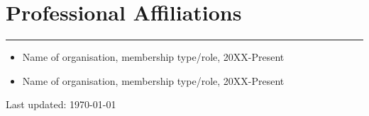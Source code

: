 \documentclass{article}
\begin{document}
\section*{Professional Affiliations}
\hrule
\vspace{1em}
\begin{itemize}[leftmargin=*]
    \item[]Name of organisation, membership type/role, 20XX-Present
    \item[]Name of organisation, membership type/role, 20XX-Present
\end{itemize}

\begin{center}
  \begin{footnotesize}
    Last updated: \today
  \end{footnotesize}
\end{center}
\end{document}
